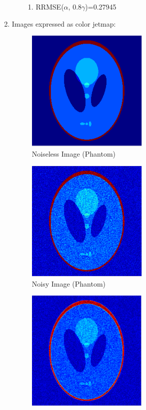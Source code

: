 \documentclass[12pt]{article}
\theoremstyle{definition}
\numberwithin{thm}{section}
\begin{document}
\begin{enumerate}[label=(\alph*)]
\begin{enumerate}[label=(\arabic*)]
\begin{enumerate}
		\item RRMSE($\alpha$, 0.8$\gamma$)=0.27945
	\end{enumerate}
\end{enumerate} \newpage
\item Images expressed as color jetmap:
	\begin{figure}[H]
		\centering
    	\includegraphics[width=0.55\textwidth]{imgs/Original_Phantom.png}
    	\caption{Noiseless Image (Phantom)}
    	\label{fig:NL1}
	\end{figure}
	\begin{figure}[H]
		\centering
    	\includegraphics[width=0.55\textwidth]{imgs/Noisy_Phantom.png}
    	\caption{Noisy Image (Phantom)}
    	\label{fig:N1}
	\end{figure}
	\begin{figure}[H]
		\centering
    	\includegraphics[width=0.55\textwidth]{imgs/Quadratic_Phantom.png}

\end{figure}
\end{enumerate}
\end{document}

